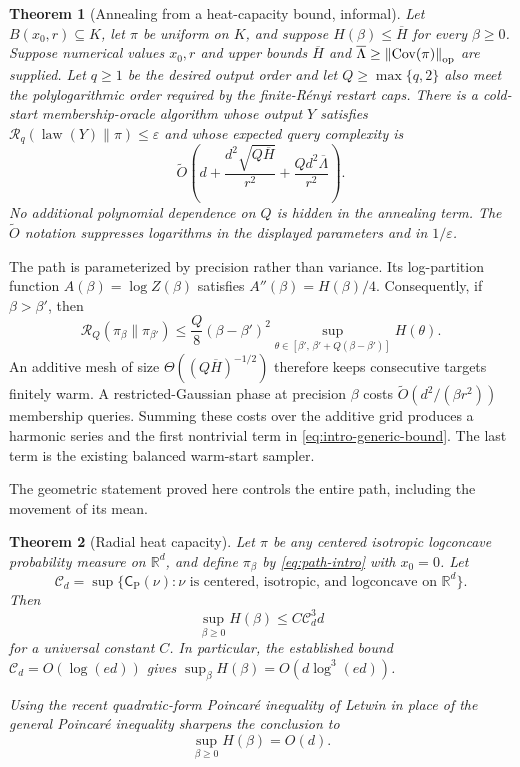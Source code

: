 \documentclass[11pt]{article}
\newtheorem{theorem}{Theorem}[section]
\theoremstyle{remark}
\newcommand{\R}{\mathbb R}
\newcommand{\1}{\bm 1}
\newcommand{\eps}{\varepsilon}
\newcommand{\cP}{\mathsf C_{\mathrm P}}
\newcommand{\Cov}{\operatorname{Cov}}
\newcommand{\law}{\operatorname{law}}
\newcommand{\norm}[1]{\left\lVert #1\right\rVert}
\begin{document}
\begin{theorem}[Annealing from a heat-capacity bound, informal]
\label{thm:intro-generic}
Let $B(x_0,r)\subseteq K$, let $\pi$ be uniform on $K$, and suppose
$H(\beta)\leq\overline H$ for every $\beta\geq0$.  Suppose numerical
values $x_0,r$ and upper bounds $\overline H$ and
$\overline\Lambda\geq\norm{\Cov(\pi)}_{\rm op}$ are supplied.  Let
$q\geq1$ be the desired output order and let
$Q\geq\max\{q,2\}$ also meet the polylogarithmic order required by the
finite-R\'enyi restart caps.  There is a cold-start membership-oracle
algorithm whose output $Y$ satisfies
$\mathcal R_q(\law(Y)\|\pi)\leq\eps$ and whose expected query complexity
is
\begin{equation}\label{eq:intro-generic-bound}
  \widetilde O\!\left(
      d+\frac{d^2\sqrt{Q\overline H}}{r^2}
      +\frac{Qd^2\overline\Lambda}{r^2}
  \right).
\end{equation}
No additional polynomial dependence on $Q$ is hidden in the annealing
term.  The
$\widetilde O$ notation suppresses logarithms in the displayed
parameters and in $1/\eps$.
\end{theorem}

The path is parameterized by precision rather than variance.  Its
log-partition function $A(\beta)=\log Z(\beta)$ satisfies
$A''(\beta)=H(\beta)/4$.  Consequently, if $\beta>\beta'$, then
\[
  \mathcal R_Q(\pi_\beta\|\pi_{\beta'})
  \leq \frac Q8(\beta-\beta')^2
       \sup_{\theta\in[\beta',\,\beta'+Q(\beta-\beta')]}H(\theta).
\]
An additive mesh of size $\Theta((Q\overline H)^{-1/2})$ therefore
keeps consecutive targets finitely warm.  A restricted-Gaussian phase
at precision $\beta$ costs $\widetilde O(d^2/(\beta r^2))$ membership
queries.  Summing these costs over the additive grid produces a
harmonic series and the first nontrivial term in
\eqref{eq:intro-generic-bound}.  The last term is the existing balanced
warm-start sampler.

The geometric statement proved here controls the entire path, including the
movement of its mean.

\begin{theorem}[Radial heat capacity]
\label{thm:intro-heat}
Let $\pi$ be any centered isotropic logconcave probability measure on
$\R^d$, and define $\pi_\beta$ by \eqref{eq:path-intro} with $x_0=0$.
Let
\[
  \mathcal C_d=\sup\{\cP(\nu):\nu\text{ is centered, isotropic, and
  logconcave on }\R^d\}.
\]
Then
\begin{equation}\label{eq:intro-poincare-heat}
  \sup_{\beta\geq0}H(\beta)\leq C\mathcal C_d^3d
\end{equation}
for a universal constant $C$.  In particular, the established bound
  $\mathcal C_d=O(\log(ed))$ gives
  $\sup_\beta H(\beta)=O(d\log^3(ed))$.

Using the recent quadratic-form Poincar\'e inequality of Letwin in place
of the general Poincar\'e inequality sharpens the conclusion to
\begin{equation}\label{eq:intro-sharp-heat}
  \sup_{\beta\geq0}H(\beta)=O(d).
\end{equation}
\end{theorem}
\end{document}
